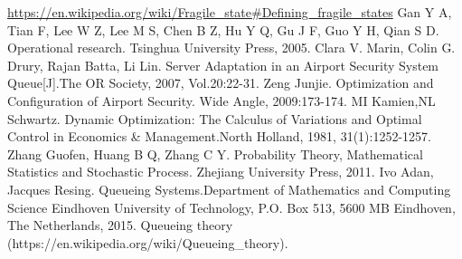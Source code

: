 \documentclass{mcmthesis}
\begin{document}
\begin{thebibliography}{99}
\url{https://en.wikipedia.org/wiki/Fragile_state#Defining_fragile_states}
Gan Y A, Tian F, Lee W Z, Lee M S, Chen B Z, Hu Y Q, Gu J F, Guo Y H, Qian S D. Operational research. Tsinghua University Press, 2005.
Clara V. Marin, Colin G. Drury, Rajan Batta, Li Lin. Server Adaptation in an Airport Security System Queue[J].The OR Society, 2007, Vol.20:22-31.
Zeng Junjie. Optimization and Configuration of Airport Security. Wide Angle, 2009:173-174.
MI Kamien,NL Schwartz. Dynamic Optimization: The Calculus of Variations and Optimal Control in Economics \& Management.North Holland, 1981, 31(1):1252-1257.
Zhang Guofen, Huang B Q, Zhang C Y. Probability Theory, Mathematical Statistics and Stochastic Process. Zhejiang University Press, 2011.
Ivo Adan, Jacques Resing. Queueing Systems.Department of Mathematics and Computing Science Eindhoven University of Technology, P.O. Box 513, 5600 MB Eindhoven, The Netherlands, 2015.
Queueing theory (https://en.wikipedia.org/wiki/Queueing\_theory).
\end{thebibliography}
\end{document}
